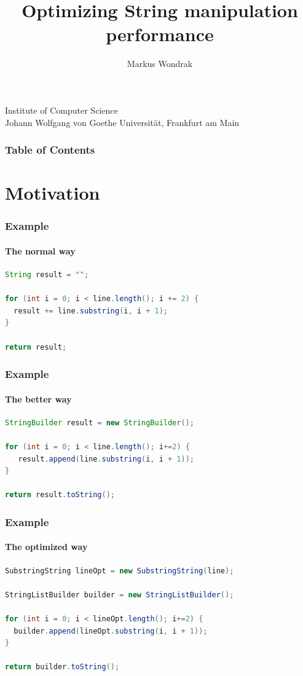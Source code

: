 \documentclass{beamer}
\begin{document}
\title[Optimization]
{Optimizing String manipulation performance}
\author{Markus Wondrak}
\institute
{
  Institute of Computer Science\\
  Johann Wolfgang von Goethe Universität, Frankfurt am Main
}

\frame{\titlepage}

\begin{frame}
  \frametitle{Table of Contents}
  \tableofcontents
\end{frame}

\section{Motivation}  

\frame{\sectionpage}

\begin{frame}[fragile]

  \frametitle{Example}
  \framesubtitle{The normal way}

  \begin{lstlisting}[language=Java]
String result = "";

for (int i = 0; i < line.length(); i += 2) {
  result += line.substring(i, i + 1);
}

return result;
  \end{lstlisting}%
\end{frame}

\begin{frame}[fragile]

  \frametitle{Example}
  \framesubtitle{The better way}

  \begin{lstlisting}[language=Java]
StringBuilder result = new StringBuilder();

for (int i = 0; i < line.length(); i+=2) {
   result.append(line.substring(i, i + 1));
}

return result.toString();
  \end{lstlisting}%
\end{frame}


\begin{frame}[fragile]
  \frametitle{Example}
  \framesubtitle{The optimized way}
  \begin{lstlisting}[language=Java]
SubstringString lineOpt = new SubstringString(line);
  
StringListBuilder builder = new StringListBuilder();

for (int i = 0; i < lineOpt.length(); i+=2) {
  builder.append(lineOpt.substring(i, i + 1));
}

return builder.toString();
  \end{lstlisting}%
\end{frame}
\end{document}
